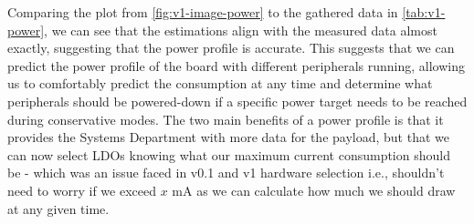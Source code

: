 Comparing the plot from \autoref{fig:v1-image-power} to the gathered data in \autoref{tab:v1-power}, we can see that the estimations align with the measured data almost exactly, suggesting that the power profile is accurate. This suggests that we can predict the power profile of the board with different peripherals running, allowing us to comfortably predict the consumption at any time and determine what peripherals should be powered-down if a specific power target needs to be reached during conservative modes. The two main benefits of a power profile is that it provides the Systems Department with more data for the payload, but that we can now select LDOs knowing what our maximum current consumption should be - which was an issue faced in v0.1 and v1 hardware selection i.e., shouldn't need to worry if we exceed $x$ mA as we can calculate how much we should draw at any given time.
